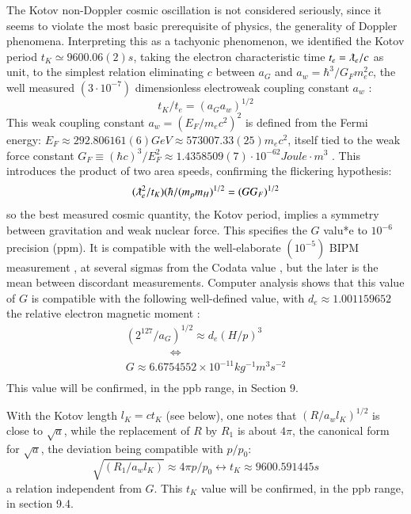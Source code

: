 \documentclass[twoside,draft]{article}
\begin{document}
\begin{sloppypar}
The Kotov non-Doppler cosmic oscillation \cite{Kotov1} is not considered seriously, since it seems to violate the most basic prerequisite of physics, the generality of Doppler phenomena. Interpreting this as a tachyonic phenomenon, we identified the Kotov period $t_{K} \simeq 9600.06(2) s$, taking the electron characteristic time $t_{e} = \lambdabar_{e} /c$ as unit, to the simplest relation eliminating $c$ between $a_{G}$ and $a_{w}=
\hbar^{3} /G_{F} m_{e}^{2} c$, the well measured $(3\cdot 10^{-7})$ dimensionless electroweak coupling constant $a_{w}$ :
\begin{equation}
t_{K} / t_{e} = (a_{G} a_{w})^{1/2}
\end{equation}
This weak coupling constant \cite{Carr} $a_{w} = (E_{F} /m_{e} c^{2} )^{2}$ is defined from the Fermi energy\cite{Tanabashi}: 
$
E_{F} \approx 292.806161(6) GeV \approx 573007.33(25) m_{e} c^{2}
$, itself tied to the weak force constant 
$
G_{F} \equiv (\hbar c)^{3} /E_{F}^{2} \approx
1.4358509(7) \cdot 10^{-62} Joule \cdot m^{3}
$
. This introduces the product of two area speeds, confirming the flickering hypothesis:
\begin{equation}
(\lambdabar_{e}^2/t_{K} )(\hbar/(m_{p} m_{H})^{1/2} = (GG_{F})^{1/2}
\end{equation}
so the best measured cosmic quantity, the Kotov period, implies a symmetry between gravitation and weak nuclear force. This specifies the $G$ valu*e to $10^{-6}$ precision (ppm). It is compatible with the well-elaborate $(10^{-5})$ BIPM measurement \cite{Quinn}, at several sigmas from the Codata value \cite{Tanabashi}, but the later is the mean between discordant measurements. Computer analysis shows that this value of $G$ is compatible with the following well-defined value, with $d_{e} \approx 1.001159652$ the relative electron magnetic moment :
$$\begin{array}{ll}
(2^{127} /a_{G} )^{1/2} \approx d_{e} (H/p)^{3} \\
\qquad  \qquad \Leftrightarrow \\
G \approx 6.6754552 \times 10^{-11} kg^{-1} m^{3} s^{-2} \\
\end{array}$$
This value will be confirmed, in the ppb range, in Section 9.

With the Kotov length $l_{K} = ct_{K}$ (see below), one notes that $(R/a_w l_K)^{1/2} $ is close to $\sqrt{a}$, while the replacement of $R$ by $R_{1}$ is about $4\pi$, the canonical form for $\sqrt{a}$, the deviation being compatible with $p/p_{0}$:
$$\sqrt{(R_{1} /a_{w} l_{K})} \approx 4\pi p/p_{0} \leftrightarrow t_{K} \approx 9 600.591445 s$$ a relation independent from $G$. This $t_K$ value will be confirmed, in the ppb range, in section 9.4. 


\end{sloppypar}
\end{document}
